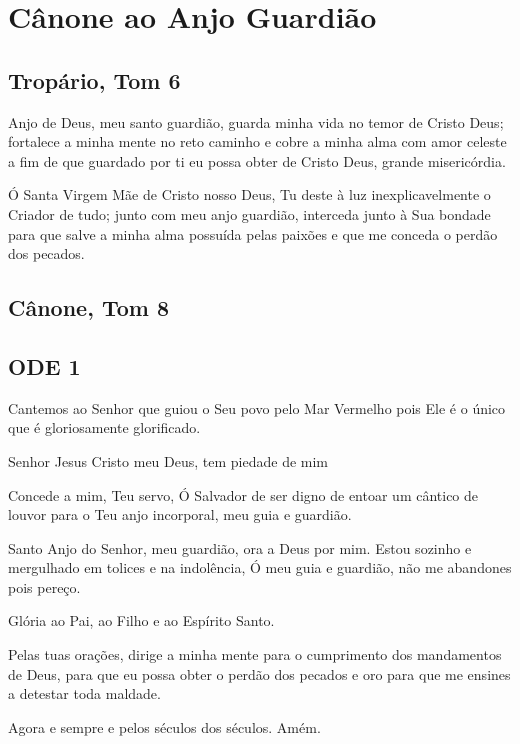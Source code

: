 \documentclass{subfiles}
\begin{document}
\cleardoubleevenpage{}
\pagestyle{empty}

\chapter{Cânone ao Anjo Guardião}
\pagestyle{headings}

\section*{Tropário, Tom 6}

Anjo de Deus, meu santo guardião, guarda minha vida no temor de
Cristo Deus; fortalece a minha mente no reto caminho e cobre a minha alma
com amor celeste a fim de que guardado por ti eu possa obter de Cristo Deus,
grande misericórdia.

\theotokion{}Ó Santa Virgem Mãe de Cristo nosso Deus, Tu deste à luz
inexplicavelmente o Criador de tudo; junto com meu anjo guardião, interceda
junto à Sua bondade para que salve a minha alma possuída pelas paixões e que
me conceda o perdão dos pecados.

\section*{Cânone, Tom 8}

\section*{ODE 1}

\eirmos{}Cantemos ao Senhor que guiou o Seu povo pelo Mar Vermelho pois Ele
é o único que é gloriosamente glorificado.

Senhor Jesus Cristo meu Deus, tem piedade de mim

\textbf{}Concede a mim, Teu servo, Ó Salvador de ser
digno de entoar um cântico de louvor para o Teu anjo incorporal, meu guia e
guardião.

Santo Anjo do Senhor, meu guardião, ora a Deus por mim.
Estou sozinho e mergulhado em tolices e na indolência, Ó meu guia e
guardião, não me abandones pois pereço.

Glória ao Pai, ao Filho e ao Espírito Santo.

Pelas tuas orações, dirige a minha mente para o cumprimento dos
mandamentos de Deus, para que eu possa obter o perdão dos pecados e oro
para que me ensines a detestar toda maldade.

Agora e sempre e pelos séculos dos séculos. Amém.
\end{document}
